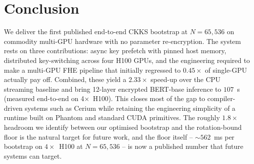 \documentclass[conference]{IEEEtran}
\begin{document}
\section{Conclusion}

We deliver the first published end-to-end CKKS bootstrap at
$N{=}65{,}536$ on commodity multi-GPU hardware with no parameter
re-encryption. The system rests on three contributions:
async key prefetch with pinned host memory, distributed key-switching
across four H100 GPUs, and the engineering required to make a multi-GPU
FHE pipeline that initially regressed to $0.45\times$ of single-GPU
actually pay off. Combined, these yield a $2.33\times$ speed-up over the
CPU streaming baseline and bring 12-layer encrypted BERT-base
inference to $107$~s (measured end-to-end on 4$\times$~H100). This closes most of the gap to
compiler-driven systems such as Cerium while retaining the engineering
simplicity of a runtime built on Phantom and standard CUDA primitives.
The roughly $1.8\times$ headroom we identify between our optimised
bootstrap and the rotation-bound floor is the natural target for
future work, and the floor itself -- $\sim 562$~ms per bootstrap on
$4\times$~H100 at $N{=}65{,}536$ -- is now a published number that
future systems can target.



\end{document}
